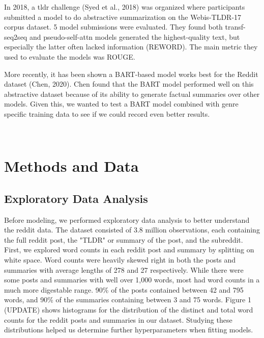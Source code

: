 \documentclass[11pt,a4paper, twocolumn]{article}
\begin{document}
In 2018, a tldr challenge (Syed et al., 2018) was organized where participants submitted a model to do abstractive summarization on the Webis-TLDR-17 corpus dataset. 5 model submissions were evaluated. They found both transf-seq2seq and pseudo-self-attn models generated the highest-quality text, but especially the latter often lacked information (REWORD). The main metric they used to evaluate the models was ROUGE. 

More recently, it has been shown a BART-based model works best for the Reddit dataset (Chen, 2020). Chen found that the BART model performed well on this abstractive dataset because of its ability to generate factual summaries over other models. Given this, we wanted to test a BART model combined with genre specific training data to see if we could record even better results.




\\

\section{Methods and Data}

\subsection{Exploratory Data Analysis}

Before modeling, we performed exploratory data analysis to better understand the reddit data. 
The dataset consisted of 3.8 million observations, each containing the full reddit post, the "TLDR" or summary of the post, and the subreddit. 
First, we explored word counts in each reddit post and summary by splitting on white space. 
Word counts were heavily skewed right in both the posts and summaries with average lengths of 278 and 27 respectively. 
While there were some posts and summaries with well over 1,000 words, most had word counts in a much more digestable range. 
90\% of the posts contained between 42 and 795 words, and 90\% of the summaries containing between 3 and 75 words. 
Figure 1 (UPDATE) shows histograms for the distribution of the distinct and total word counts for the reddit posts and summaries in our dataset. 
Studying these distributions helped us determine further hyperparameters when fitting models. 
\end{document}
